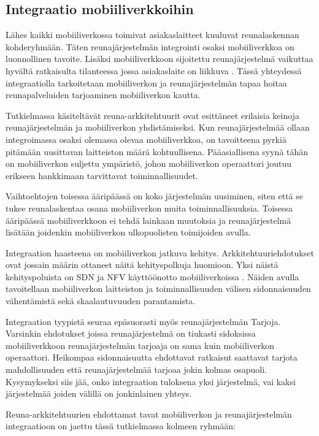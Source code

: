 
\subsection{Integraatio mobiiliverkkoihin} \label{integraatio}
Lähes kaikki mobiiliverkossa toimivat asiakaslaitteet kuuluvat reunalaskennan kohderyhmään.
Täten reunajärjestelmän integrointi osaksi mobiiliverkkoa on luonnollinen tavoite.
Lisäksi mobiiliverkkoon sijoitettu reunajärjestelmä vaikuttaa hyvältä ratkaisulta tilanteessa jossa asiakaslaite on liikkuva \cite{gusev2018going}.
Tässä yhteydessä integraatiolla tarkoitetaan mobiiliverkon ja reunajärjestelmän tapaa hoitaa reunapalveluiden tarjoaminen mobiiliverkon kautta.

Tutkielmassa käsiteltävät reuna-arkkitehtuurit ovat esittäneet erilaisia keinoja reunajärjestelmän ja mobiiliverkon yhdistämiseksi.
Kun reunajärjestelmää ollaan integroimassa osaksi olemassa olevaa mobiiliverkkoa, on tavoitteena pyrkiä pitämään uusittavan laitteiston määrä kohtuullisena. Pääasiallisena syynä tähän on mobiiliverkon suljettu ympäristö, johon mobiiliverkon operaattori joutuu erikseen hankkimaan tarvittavat toiminnallisuudet.

Vaihtoehtojen toisessa ääripäässä on koko järjestelmän uusiminen, siten että se tukee reunalaskentaa osana mobiiliverkon muita toiminnallisuuksia.
Toisessa ääripäässä mobiiliverkkoon ei tehdä lainkaan muutoksia ja reunajärjestelmä lisätään joidenkin mobiiliverkon ulkopuolisten toimijoiden avulla. 

Integraation haasteena on mobiiliverkon jatkuva kehitys. Arkkitehtuuriehdotukset ovat jossain määrin ottaneet näitä kehityspolkuja huomioon. 
Yksi näistä kehityspoluista on SDN ja NFV käyttöönotto mobiiliverkoissa \cite{heinonen2014dynamic, nfvwhite}. 
Näiden avulla tavoitellaan mobiiliverkon laitteiston ja toiminnallisuuden välisen sidonnaisuuden vähentämistä sekä skaalautuvuuden parantamista.

Integraation tyypistä seuraa epäsuorasti myös reunajärjestelmän Tarjoja.
Varsinkin ehdotukset joissa reunajärjestelmä on tiukasti sidoksissa mobiiliverkkoon reunajärjestelmän tarjoaja on sama kuin mobiiliverkon operaattori. Heikompaa sidonnaisuutta ehdottavat ratkaisut saattavat tarjota mahdollisuuden että reunajärjestelmää tarjoaa jokin kolmas osapuoli. Kysymykseksi siis jää, onko integraation tuloksena yksi järjestelmä, vai kaksi järjestelmää joiden välillä on jonkinlainen yhteys.

Reuna-arkkitehtuurien ehdottamat tavat mobiiliverkon ja reunajärjestelmän integraatioon on jaettu tässä tutkielmassa kolmeen ryhmään:

